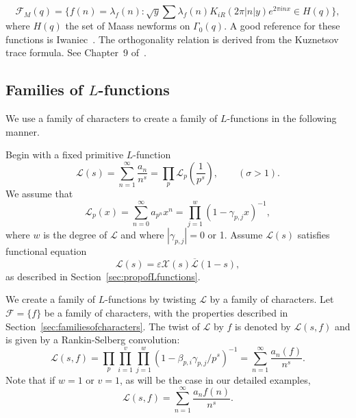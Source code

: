 \documentclass[12pt,letterpaper]{amsart}
\theoremstyle{plain}
\theoremstyle{definition}
\theoremstyle{remark}
\numberwithin{equation}{subsection}
\numberwithin{theorem}{subsection}
\numberwithin{table}{subsection}
\begin{document}
\begin{equation}{\mathcal F}_{M}(q)=\{f(n)= \lambda_f(n):
\sqrt{y} \sum \lambda_f(n) K_{iR}(2\pi |n|y) e^{2\pi i n x} \in H(q)\},  
\end{equation}
where $H(q)$  the set of Maass newforms on  $\Gamma_0(q)$.
A good reference for these functions is Iwaniec~\cite{Iw2}.
The orthogonality relation is derived from the Kuznetsov trace
formula.  See Chapter~9 of~\cite{Iw2}.

\subsection{ Families of $L$-functions}\label{sec:familiesofLfunctions}

We use a family of characters to create a family of $L$-functions
in the following manner. 

Begin with a fixed primitive $L$-function
\begin{equation}\mathcal{L}(s)=\sum_{n=1}^\infty \frac{a_n}{n^s}=
\prod_p \mathcal{L}_p\left(\frac1{p^s}\right), \qquad (\sigma>1) .
\label{eqn:generalL}
\end{equation}
  We assume that
\begin{equation}\label{eqn:generalLp}
\mathcal{L}_p(x)=\sum_{n=0}^\infty a_{p^n}x^n 
=\prod_{j=1}^w (1-\gamma_{p,j} x)^{-1},
\end{equation}
where $w$ is the degree of $\mathcal{L}$ and where
$|\gamma_{p,j}|=0$ or 1. Assume $\mathcal{L}(s)$ satisfies
functional equation
\begin{equation}
\mathcal{L}(s)=
\varepsilon {\mathcal X}(s) \overline{\mathcal{L}}(1-s), 
\label{eqn:generalLfe}
\end{equation}
as described in Section~\ref{sec:propofLfunctions}.

We create a family of $L$-functions by twisting $\mathcal{L}$
by a family of characters.
Let $\mathcal F=\{f\}$ be a family of
characters, with the properties described 
in Section~\ref{sec:familiesofcharacters}.
The twist of $\mathcal{L}$ by $f$  is denoted by $\mathcal{L}(s,f)$ and is
given by a Rankin-Selberg convolution:
\begin{equation} \label{eqn:rankinselberg}
\mathcal{L}(s,f)=
\prod_p\prod_{i=1}^v\prod_{j=1}^w(1-\beta_{p,i}\gamma_{p,j}/p^s)^{-1}=\sum_{n=1}^\infty
\frac{a_n(f)}{n^s}. 
\end{equation}
Note that if $w=1$ or $v=1$, as will be the case in our detailed
examples,
\begin{equation}
\mathcal{L}(s,f)=\sum_{n=1}^\infty
\frac{a_n f(n)}{n^s}.
\end{equation}
\end{document}
